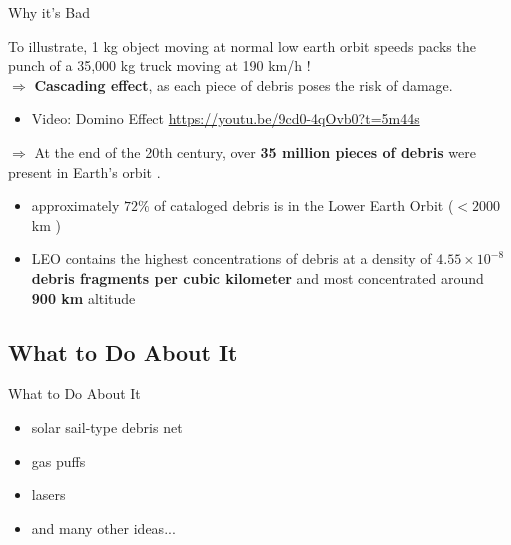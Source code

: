 \documentclass{beamer}
\begin{document}
\begin{frame}{Why it's Bad}

To illustrate, 1 kg object moving at normal low earth orbit speeds packs the punch of a 35,000 kg truck moving at 190 km/h \cite{punch}!\\
\(\Rightarrow{}\) \textbf{Cascading effect}, as each piece of debris poses the risk of damage.
 \begin{itemize}
  \item {
     Video: Domino Effect \url{https://youtu.be/9cd0-4qOvb0?t=5m44s}
  }
 \end{itemize}
\(\Rightarrow{}\) At the end of the 20th century, over \textbf{35 million pieces of debris} were present in Earth's orbit \cite{1995 IA}.
  \begin{itemize}
      \item{approximately \(72\% \) of cataloged debris is in the Lower Earth Orbit (\(< 2000\) km \cite{1995 IA})}
      \item{LEO contains the highest concentrations of debris at a density of \textbf{\(4.55 \times 10^{-8}\) debris fragments per cubic kilometer} and most concentrated around \textbf{900 km} altitude \cite{fragments}}
  \end{itemize}

\end{frame}

\subsection{What to Do About It}

\begin{frame}{What to Do About It}
  \begin{itemize}
  \item {
    solar sail-type debris net 
  }
  \item {   
    gas puffs
  }
  \item {
    lasers
  }
  \item {
   and many other ideas...
  }

  \end{itemize}
\end{frame}
\end{document}
